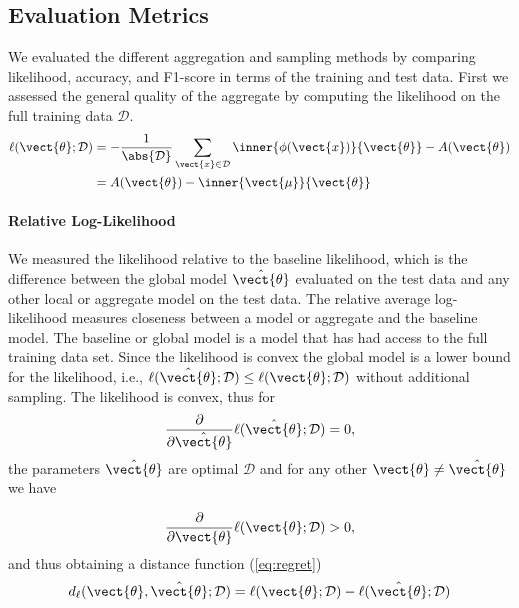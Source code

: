 \subsection{Evaluation Metrics}
\label{sec:evaluation}
We evaluated the different aggregation and sampling methods by comparing likelihood, accuracy, and F1-score in terms of the training and test data. 
First we assessed the general quality of the aggregate by computing the likelihood on the full training data $\mathcal{D}$.
\begin{equation}
    \begin{split}
        \ell(\vect{\theta} ; \mathcal{D}) &= -\frac{1}{\abs{\mathcal{D}}} \sum_{\vect{x} \in \mathcal{D}} \inner{\phi(\vect{x})}{\vect{\theta}} - A(\vect{\theta}) \\    
        &= A(\vect{\theta}) - \inner{\vect{\mu}}{\vect{\theta}}
    \end{split}
\end{equation}

\paragraph*{Relative Log-Likelihood}
We measured the likelihood relative to the baseline likelihood, which is the difference between the global model $\hat{\vect{\theta}}$ evaluated on the test data and any other local or aggregate model on the test data. 
The relative average log-likelihood measures closeness between a model or aggregate and the baseline model. 
The baseline or global model is a model that has had access to the full training data set.
Since the likelihood is convex the global model is a lower bound for the likelihood, i.e., $\ell(\hat{\vect{\theta}} ; \mathcal{D}) \leq   \ell(\vect{\theta} ; \mathcal{D})$ without additional sampling.
The likelihood is convex, thus for 
\begin{equation}
    \frac{\partial}{\partial \hat{\vect{\theta}}} \ell(\hat{\vect{\theta}} ; \mathcal{D})  = 0,
\end{equation}
the parameters $\hat{\vect{\theta}}$ are optimal \wrt $\mathcal{D}$ and for any other $\vect{\theta} \neq \hat{\vect{\theta}}$ we have 

\begin{equation}
    \frac{\partial}{\partial \vect{\theta}} \ell(\vect{\theta} ; \mathcal{D})  > 0,
\end{equation}
and thus obtaining a distance function (\autoref{eq:regret})
\begin{equation}
\label{eq:dist_ll}
d_{\ell}(\vect{\theta}, \hat{\vect{\theta}}; \mathcal{D}) = \ell(\vect{\theta} ; \mathcal{D}) -    \ell(\hat{\vect{\theta}} ; \mathcal{D})
\end{equation}

